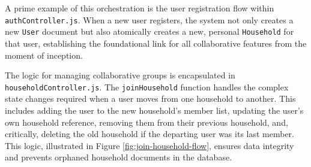\textgap

A prime example of this orchestration is the user registration flow within \\\texttt{authController.js}. When a new user registers, the system not only creates a new \texttt{User} document but also atomically creates a new, personal \texttt{Household} for that user, establishing the foundational link for all collaborative features from the moment of inception.

\textgap

The logic for managing collaborative groups is encapsulated in \\\texttt{householdController.js}. The \texttt{joinHousehold} function handles the complex state changes required when a user moves from one household to another. This includes adding the user to the new household's member list, updating the user's own household reference, removing them from their previous household, and, critically, deleting the old household if the departing user was its last member. This logic, illustrated in Figure \ref{fig:join-household-flow}, ensures data integrity and prevents orphaned household documents in the database.

